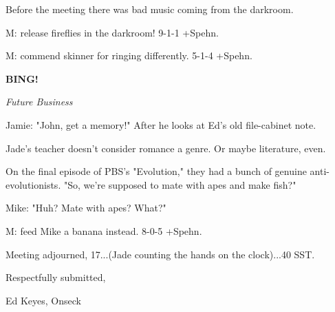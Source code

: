 \documentclass[12pt]{article}
\newcommand{\bing}{{\bf BING!} }
\newcommand{\goto}[1]{\bing \vskip 12pt \centerline{{\em{#1}}}}
\begin{document}
Before the meeting there was bad music coming from the darkroom.

M: release fireflies in the darkroom! 9-1-1 +Spehn.

M: commend skinner for ringing differently. 5-1-4 +Spehn.

\goto{Future Business}

Jamie: "John, get a memory!" After he looks at Ed's old file-cabinet note.

Jade's teacher doesn't consider romance a genre. Or maybe literature, even.

On the final episode of PBS's "Evolution," they had a bunch of genuine anti-evolutionists. "So, we're supposed to mate with apes and make fish?"

Mike: "Huh? Mate with apes? What?"

M: feed Mike a banana instead. 8-0-5 +Spehn.

\vspace{12pt}

\noindent
Meeting adjourned, 17...(Jade counting the hands on the clock)...40 SST.

\vspace{18pt}

\centerline{Respectfully submitted,}
\centerline{Ed Keyes, Onseck}
\end{document}
